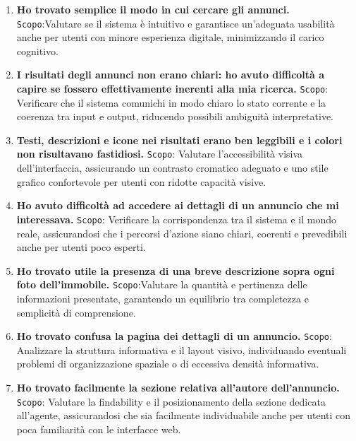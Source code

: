 \begin{enumerate}
	
	\item \textbf{Ho trovato semplice il modo in cui cercare gli annunci.}
	\newline
	\texttt{Scopo}:Valutare se il sistema è intuitivo e garantisce un’adeguata usabilità anche per utenti con minore esperienza digitale, minimizzando il carico cognitivo.
	
	\item \textbf{I risultati degli annunci non erano chiari: ho avuto difficoltà a capire se fossero effettivamente inerenti alla mia ricerca.}
	\newline
	\texttt{Scopo}: Verificare che il sistema comunichi in modo chiaro lo stato corrente e la coerenza tra input e output, riducendo possibili ambiguità interpretative.
	
	\item \textbf{Testi, descrizioni e icone nei risultati erano ben leggibili e i colori non risultavano fastidiosi.}
	\newline
	\texttt{Scopo}: Valutare l’accessibilità visiva dell’interfaccia, assicurando un contrasto cromatico adeguato e uno stile grafico confortevole per utenti con ridotte capacità visive.
	
	\item \textbf{Ho avuto difficoltà ad accedere ai dettagli di un annuncio che mi interessava.}
	\newline
	\texttt{Scopo}: Verificare la corrispondenza tra il sistema e il mondo reale, assicurandosi che i percorsi d’azione siano chiari, coerenti e prevedibili anche per utenti poco esperti.
	
	\item \textbf{Ho trovato utile la presenza di una breve descrizione sopra ogni foto dell’immobile.}
	\newline
	\texttt{Scopo}:Valutare la quantità e pertinenza delle informazioni presentate, garantendo un equilibrio tra completezza e semplicità di comprensione.
	
	\item \textbf{Ho trovato confusa la pagina dei dettagli di un annuncio.}
	\newline
	\texttt{Scopo}: Analizzare la struttura informativa e il layout visivo, individuando eventuali problemi di organizzazione spaziale o di eccessiva densità informativa.
	
	\item \textbf{Ho trovato facilmente la sezione relativa all’autore dell’annuncio.}
	\newline
	\texttt{Scopo}: Valutare la findability e il posizionamento della sezione dedicata all’agente, assicurandosi che sia facilmente individuabile anche per utenti con poca familiarità con le interfacce web.
	

\end{enumerate}
